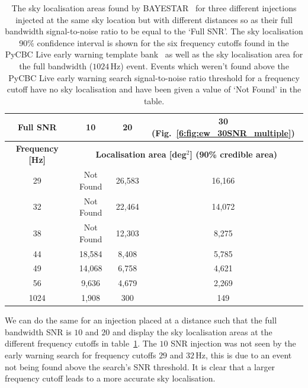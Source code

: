 \begin{table}[ht]
    \centering
    \setlength{\tabcolsep}{4pt}
    \begin{tabular}{cccc}
        \toprule
        \textbf{Full SNR} & \textbf{10} & \textbf{20} & \textbf{30 (Fig.~\ref{6:fig:ew_30SNR_multiple})} \\
        \midrule
        \textbf{Frequency [Hz]} & \multicolumn{3}{c}{\textbf{Localisation area [deg$^{2}$] (90\% credible area) }} \\
        \cmidrule(lr){2-4}
        29 & Not Found & 26,583 & 16,166 \\
        32 & Not Found & 22,464 & 14,072 \\
        38 & Not Found & 12,303 & 8,275 \\
        44 & 18,584 & 8,408 & 5,785 \\
        49 & 14,068 & 6,758 & 4,621 \\
        56 & 9,636 & 4,679 & 2,269 \\
        1024 & 1,908 & 300 & 149 \\
        \bottomrule
    \end{tabular}
    \caption{The sky localisation areas found by BAYESTAR~\cite{BAYESTAR:2016} for three different \gwadj injections injected at the same sky location but with different distances so as their full bandwidth signal-to-noise ratio to be equal to the `Full SNR'. The sky localisation 90\% confidence interval is shown for the six frequency cutoffs found in the PyCBC Live early warning template bank~\cite{PyCBC_earlywarning:2020} as well as the sky localisation area for the full bandwidth ($1024 \, \text{Hz}$) event. Events which weren't found above the PyCBC Live early warning search signal-to-noise ratio threshold for a frequency cutoff have no sky localisation and have been given a value of `Not Found' in the table.}
    \label{6:tab:skymap_early_warning}
\end{table}
%

We can do the same for an injection placed at a distance such that the full bandwidth SNR is $10$ and $20$ and display the sky localisation areas at the different frequency cutoffs in table~\ref{6:tab:skymap_early_warning}. The $10$ SNR injection was not seen by the early warning search for frequency cutoffs $29$ and $32 \, \text{Hz}$, this is due to an event not being found above the search's SNR threshold. It is clear that a larger frequency cutoff leads to a more accurate sky localisation.

